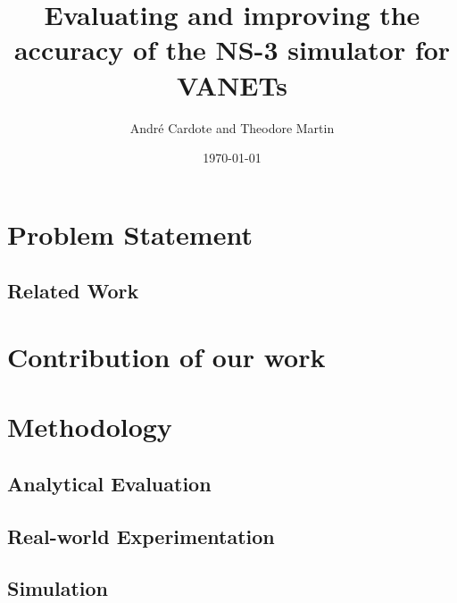 \documentclass[12pt]{article}
\title{Evaluating and improving the accuracy of the NS-3 simulator for VANETs}
\date{\today}
\author{Andr\'e Cardote and Theodore Martin}
\begin{document}
  \maketitle 
  
\section{Problem Statement}

\subsection{Related Work}

\section{Contribution of our work}

\section{Methodology}

\subsection{Analytical Evaluation}

\subsection{Real-world Experimentation}

\subsection{Simulation}
\end{document}
